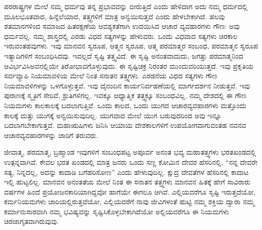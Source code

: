 ಪರರಾಷ್ಟ್ರಗಳ ಮೇಲೆ ನಮ್ಮ ಧರ್ಮವು ತನ್ನ ಪ್ರಭಾವವನ್ನು ಬೀರುತ್ತಿದೆ ಎಂದು ಹೇಳಿದಾಗ ಅದು ನಮ್ಮ ಧರ್ಮದಲ್ಲಿ ಮೂಲಭೂತವಾದ, ಹಿನ್ನೆಲೆಯಾದ, ತತ್ತ್ವಗಳಿಗೆ ಮಾತ್ರ ಅನ್ವಯಿಸುತ್ತದೆ ಎಂದು ಹೇಳಬೇಕಾಗಿದೆ. ಹಲವು ಶತಮಾನಗಳಿಂದ ಸಮಾಜದ ಹಿತರಕ್ಷಣೆಯ ಆವಶ್ಯಕತೆಗಾಗಿ ಉದಯಿಸಿದ ಆಚಾರ ವ್ಯವಹಾರಗಳು ಗೌಣ: ಅವು ಧರ್ಮವಲ್ಲ. ನಮ್ಮ ಶಾಸ್ತ್ರದಲ್ಲಿ ಎರಡು ವಿಧದ ಸತ್ಯಗಳನ್ನು ಹೇಳುವರು. ಒಂದು ವಿಧವಾದ ಸತ್ಯಗಳು ಚಿರಕಾಲ ಇರುವಂತಹವುಗಳು. ಇವು ಮಾನವನ ಸ್ವರೂಪ, ಆತ್ಮನ ಸ್ವರೂಪ, ಆತ್ಮ ಪರಮಾತ್ಮರ ಸಂಬಂಧ, ಪರಮಾತ್ಮನ ಸ್ವರೂಪ ಇತ್ಯಾದಿಗಳಿಗೆ ಸಂಬಂಧಿಸಿದವು. ಇವಲ್ಲದೆ ಸೃಷ್ಟಿ ತತ್ತ್ವವಿದೆ. ಈ ಸೃಷ್ಟಿ ಅನಂತವಾದುದು, ಜಗತ್ತು ಪರಮಾತ್ಮನಿಂದ ಆವಿರ್ಭವಿಸಿ\break ಅವನಲ್ಲಿಯೇ ತಿರೋಭಾವಗೊಳ್ಳುವುದು. ಈ ಸೃಷ್ಟಿಚಕ್ರ ನಿರಂತರ ಮುಂದುವರಿಯುತ್ತದೆ. ಇವು ಪ್ರಕೃತಿಯ ಸರ್ವವ್ಯಾಪಿ ನಿಯಮಾವಳಿಯ ಮೇಲೆ ನಿಂತ ಸನಾತನ ತತ್ತ್ವಗಳು. ಎರಡನೆಯ ವಿಧದ ಸತ್ಯಗಳು ಗೌಣ ನಿಯಮಾವಳಿಗಳನ್ನು ಒಳಗೊಳ್ಳುತ್ತವೆ. ಇವು ದೈನಂದಿನ ಕಾರ್ಯನಿರ್ವಹಣೆಯಲ್ಲಿ ಮಾರ್ಗದರ್ಶನ ನೀಡುತ್ತವೆ. ಇವು ಪುರಾಣಕ್ಕೆ ಸ್ಮೃತಿಗೆ ಸೇರಿವೆ, ಶ್ರುತಿಗಳಿಗಲ್ಲ. ಇವಕ್ಕೂ ಆಧ್ಯಾತ್ಮಿಕ ತತ್ತ್ವಕ್ಕೂ ಸಂಬಂಧವಿಲ್ಲ. ನಮ್ಮ ದೇಶದಲ್ಲಿ ಈ ಗೌಣ ನಿಯಮಗಳು ಕಾಲಕಾಲಕ್ಕೆ ಬದಲಾಗುತ್ತಿವೆ. ಒಂದು ಕಾಲದ, ಒಂದು ಯುಗದ ಆಚಾರವ್ಯವಹಾರಗಳು ಮತ್ತೊಂದು ಕಾಲಕ್ಕೆ ಮತ್ತು ಯುಗಕ್ಕೆ ಅನ್ವಯಿಸುವುದಿಲ್ಲ. ಯುಗವಾದ ಮೇಲೆ ಯುಗ ಬರುವುದರಿಂದ ಅವು ಇನ್ನೂ ಬದಲಾಗಬೇಕಾಗುತ್ತವೆ. ಮಹಾಋಷಿಗಳು ಜನಿಸಿ ಆಯಾಯ ದೇಶಕಾಲಗಳಿಗೆ ಉಪಯೋಗವಾಗುವಂತಹ ನವನವ ಆಚಾರ\break ವ್ಯವಹಾರಗಳನ್ನು ಜಾರಿಗೆ ತರುವರು.

ಜೀವಾತ್ಮ, ಪರಮಾತ್ಮ, ಬ್ರಹ್ಮಾಂಡ ಇವುಗಳಿಗೆ ಸಂಬಂಧಪಟ್ಟ ಅಪೂರ್ವ ಅನಂತ ಭವ್ಯ ಮಹಾತತ್ತ್ವಗಳು ಭರತಖಂಡದಲ್ಲಿ ಉತ್ಪನ್ನವಾಗಿವೆ. ಕೇವಲ ಭರತ ಖಂಡದಲ್ಲಿ ಮಾತ್ರ ಜನರು ಒಂದು ಸಣ್ಣ ಕೋಮಿನ ದೇವರ ಹೆಸರಿನಲ್ಲಿ, “ನನ್ನ ದೇವರೇ ಸತ್ಯ, ನಿನ್ನದಲ್ಲ, ಅದನ್ನು ಕಾದಾಡಿ ಬಗೆಹರಿಸೋಣ” ಎಂದು ಹೇಳುವುದಿಲ್ಲ. ಕ್ಷುದ್ರ ದೇವತೆಗಳ ಹೆಸರಿನಲ್ಲಿ ಕಾದಾಟ ಇಲ್ಲಿ ಹುಟ್ಟಲಿಲ್ಲ. ಮಾನವನ ಅನಂತತೆಯ ಮೇಲೆ ನಿಂತ ಈ ಸನಾತನ ತತ್ತ್ವಗಳು ಮಾನವನ ಹಿತಕ್ಕೆ ಹೇಗೆ ಸಾವಿರಾರು ವರ್ಷಗಳ ಹಿಂದೆ ಪ್ರಯೋಜನಕಾರಿಯಾಗಿದ್ದವೋ ಹಾಗೆಯೇ ಈಗಲೂ ಆಗಿವೆ. ಎಲ್ಲಿಯವರೆಗೂ ಸೃಷ್ಟಿ ಇರುತ್ತದೆಯೋ, ಕರ್ಮನಿಯಮಗಳು ಜಾರಿಯಲ್ಲಿರುತ್ತವೆಯೋ, ಎಲ್ಲಿಯವರೆಗೆ ನಾವು ಜೀವಿಗಳಂತೆ ಹುಟ್ಟಿ ನಮ್ಮ ಶಕ್ತಿಯ ದ್ವಾರಾ ನಮ್ಮ ಕರ್ಮಾನುಸಾರವಾಗಿ ನಮ್ಮ ಭವಿಷ್ಯವನ್ನು ಸೃಷ್ಟಿಸಿಕೊಳ್ಳಬೇಕಾಗಿದೆಯೋ ಅಲ್ಲಿಯವರೆಗೂ ಈ ನಿಯಮಗಳು ಚಿರಜಾಗೃತವಾಗಿರುವುವು.


